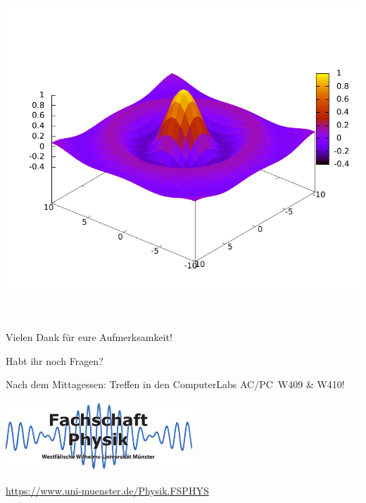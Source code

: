 \begin{frame}[<+->][fragile]
\begin{columns}
		\includegraphics[width=\textwidth]{res/gnuplot_pm3d.pdf}
	\end{columns}
\end{frame}

\section*{}
\subsection*{}

\begin{frame}
	\begin{block}{}
		\centering
		Vielen Dank für eure Aufmerksamkeit!
	\end{block}

	\begin{block}{}
		\centering
		Habt ihr noch Fragen?
	\end{block}
	
	\begin{block}{}
		\centering\LARGE
		Nach dem Mittagessen: Treffen in den ComputerLabs AC/PC~W409 \& W410!
	\end{block}

	\begin{center}
		\includegraphics[width=7cm]{res/logo.pdf}
		
		\medskip
		\url{https://www.uni-muenster.de/Physik.FSPHYS}
	\end{center}
\end{frame}


